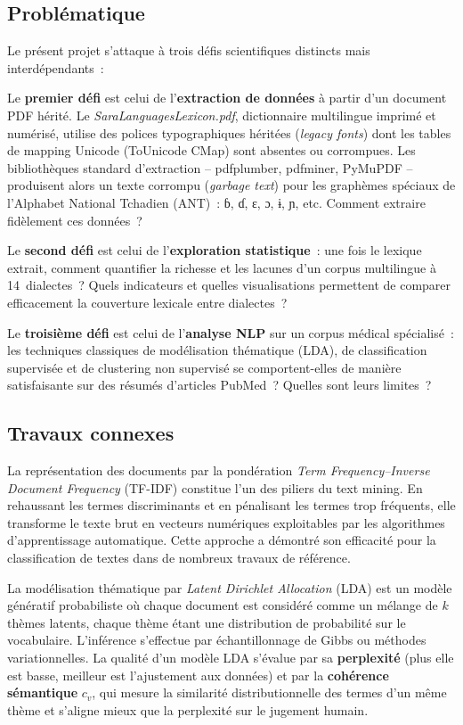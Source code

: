 \documentclass[11pt, a4paper, oneside]{article}
\begin{document}
\subsection{Problématique}

Le présent projet s'attaque à trois défis scientifiques distincts mais interdépendants~:

Le \textbf{premier défi} est celui de l'\textbf{extraction de données} à partir d'un document PDF hérité. Le \emph{SaraLanguagesLexicon.pdf}, dictionnaire multilingue imprimé et numérisé, utilise des polices typographiques héritées (\emph{legacy fonts}) dont les tables de mapping Unicode (ToUnicode CMap) sont absentes ou corrompues. Les bibliothèques standard d'extraction -- pdfplumber, pdfminer, PyMuPDF -- produisent alors un texte corrompu (\emph{garbage text}) pour les graphèmes spéciaux de l'Alphabet National Tchadien (ANT)~: ɓ, ɗ, ɛ, ɔ, ɨ, ɲ, etc. Comment extraire fidèlement ces données~?

Le \textbf{second défi} est celui de l'\textbf{exploration statistique}~: une fois le lexique extrait, comment quantifier la richesse et les lacunes d'un corpus multilingue à 14~dialectes~? Quels indicateurs et quelles visualisations permettent de comparer efficacement la couverture lexicale entre dialectes~?

Le \textbf{troisième défi} est celui de l'\textbf{analyse NLP} sur un corpus médical spécialisé~: les techniques classiques de modélisation thématique (LDA), de classification supervisée et de clustering non supervisé se comportent-elles de manière satisfaisante sur des résumés d'articles PubMed~? Quelles sont leurs limites~?

\subsection{Travaux connexes}

La représentation des documents par la pondération \emph{Term Frequency--Inverse Document Frequency} (TF-IDF) constitue l'un des piliers du text mining. En rehaussant les termes discriminants et en pénalisant les termes trop fréquents, elle transforme le texte brut en vecteurs numériques exploitables par les algorithmes d'apprentissage automatique. Cette approche a démontré son efficacité pour la classification de textes dans de nombreux travaux de référence.

La modélisation thématique par \emph{Latent Dirichlet Allocation} (LDA) est un modèle génératif probabiliste où chaque document est considéré comme un mélange de $k$ thèmes latents, chaque thème étant une distribution de probabilité sur le vocabulaire. L'inférence s'effectue par échantillonnage de Gibbs ou méthodes variationnelles. La qualité d'un modèle LDA s'évalue par sa \textbf{perplexité} (plus elle est basse, meilleur est l'ajustement aux données) et par la \textbf{cohérence sémantique} $c_v$, qui mesure la similarité distributionnelle des termes d'un même thème et s'aligne mieux que la perplexité sur le jugement humain.
\end{document}
